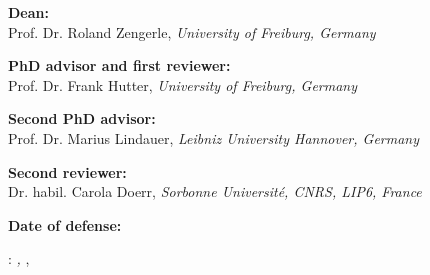 \thispagestyle{empty}

\hfill

\vfill


  \begin{flushleft}
    \noindent
    \textbf{Dean:}\\
    Prof. Dr. Roland Zengerle, \emph{University of Freiburg, Germany}\\

    \bigskip

    \noindent
    \textbf{PhD advisor and first reviewer:}\\
    Prof. Dr. Frank Hutter, \emph{University of Freiburg, Germany}\\

    \bigskip

    \noindent
    \textbf{Second PhD advisor:}\\
    Prof. Dr. Marius Lindauer, \emph{Leibniz University Hannover, Germany}%

    \bigskip

    \noindent
    \textbf{Second reviewer:}\\
    Dr. habil. Carola Doerr, \emph{Sorbonne Université, CNRS, LIP6, France}%

    \bigskip

    \noindent
    \textbf{Date of defense:}\\
    \phantom{TBD}

\noindent\myName: \textit{\myTitle,} \mySubtitle, %
\textcopyright\ \myTime


    

  \end{flushleft}

%
%
%
%
%
